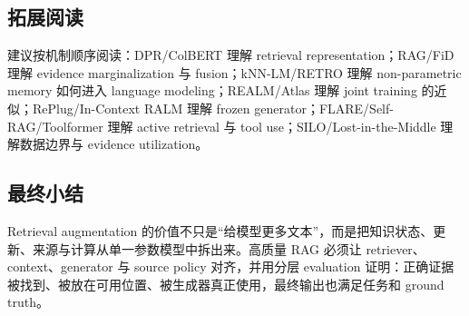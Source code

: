 \documentclass[a4paper]{article}
\begin{document}
\subsection{拓展阅读}

建议按机制顺序阅读：DPR/ColBERT 理解 retrieval representation；RAG/FiD 理解 evidence marginalization 与 fusion；kNN-LM/RETRO 理解 non-parametric memory 如何进入 language modeling；REALM/Atlas 理解 joint training 的近似；RePlug/In-Context RALM 理解 frozen generator；FLARE/Self-RAG/Toolformer 理解 active retrieval 与 tool use；SILO/Lost-in-the-Middle 理解数据边界与 evidence utilization。

\subsection{最终小结}

Retrieval augmentation 的价值不只是“给模型更多文本”，而是把知识状态、更新、来源与计算从单一参数模型中拆出来。高质量 RAG 必须让 retriever、context、generator 与 source policy 对齐，并用分层 evaluation 证明：正确证据被找到、被放在可用位置、被生成器真正使用，最终输出也满足任务和 ground truth。
\end{document}
